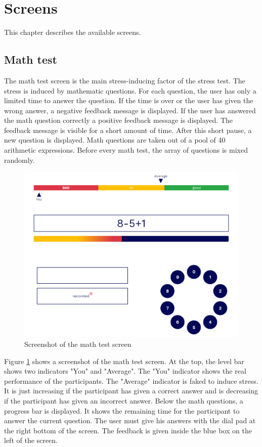 \section{Screens}
\label{sec:screens}

This chapter describes the available screens.

\subsection{Math test}
\label{sec:screens-math-test}

The math test screen is the main stress-inducing factor of the stress test.
The stress is induced by mathematic questions. 
For each question, the user has only a limited time to answer the question. 
If the time is over or the user has given the wrong answer, a negative feedback message is displayed. 
If the user has answered the math question correctly a positive feedback message is displayed. 
The feedback message is visible for a short amount of time. 
After this short pause, a new question is displayed.
Math questions are taken out of a pool of 40 arithmetic expressions. 
Before every math test, the array of questions is mixed randomly.

\begin{figure}[htb]
  \centering
  \includegraphics[width=\textwidth]{figures/Math-test.png}
  \caption{Screenshot of the math test screen}
  \label{fig:screenshot-math-test-screen}
\end{figure}

Figure \ref{fig:screenshot-math-test-screen} shows a screenshot of the math test screen.
At the top, the level bar shows two indicators "You" and "Average".
The "You" indicator shows the real performance of the participants.
The "Average" indicator is faked to induce stress.
It is just increasing if the participant has given a correct answer and is decreasing if the participant has given an incorrect answer.
Below the math questions, a progress bar is displayed.
It shows the remaining time for the participant to answer the current question.
The user must give his answers with the dial pad at the right bottom of the screen.
The feedback is given inside the blue box on the left of the screen.

